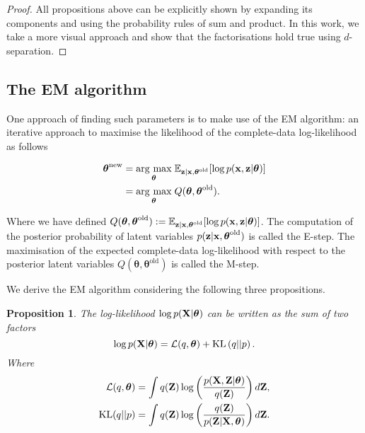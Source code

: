 \documentclass[11pt]{article}
\numberwithin{equation}{section}
\newcommand{\argmax}[1]{\underset{#1}{\operatorname{arg}\,\operatorname{max}}\;}
\newcommand{\KL}[2]{\text{KL}\left(#1 \vert\vert #2\right)}
\newcommand{\x}{{\bf x}}
\newcommand{\z}{{\bf z}}
\newtheorem{proposition}{Proposition}[section]
\begin{document}
\begin{proof}
	All propositions above can be explicitly shown by expanding its components and using the probability rules of sum and product. In this work, we take a more visual approach and show that the factorisations hold true using $d$-separation.
\end{proof}


\subsection{The EM algorithm}

One approach of finding such parameters is to make use of the EM algorithm: an iterative approach to maximise the likelihood of the complete-data log-likelihood as follows

\begin{align}
	\boldsymbol{\theta}^\text{new} &= \argmax{\boldsymbol{\theta}} \mathbb{E}_{\z\vert \x, \boldsymbol{\theta}^\text{old}}[\log p(\x, \z\vert \boldsymbol\theta)]\\
	&= \argmax{\boldsymbol{\theta}} Q(\boldsymbol\theta, \boldsymbol\theta^\text{old}).
\end{align}

Where we have defined $Q(\boldsymbol\theta, \boldsymbol\theta^\text{old}) := \mathbb{E}_{\z\vert \x, \boldsymbol{\theta}^\text{old}}[\log p(\x, \z\vert \boldsymbol\theta)]$. The computation of the posterior probability of latent variables $p(\z\vert \x, \boldsymbol\theta^\text{old})$ is called the E-step. The maximisation of the expected complete-data log-likelihood with respect to the posterior latent variables $Q(\boldsymbol\theta, \boldsymbol\theta^\text{old})$ is called the M-step.

We derive the EM algorithm considering the following three propositions.

\begin{proposition} \label{prop:log-likelihood-partition}
	The log-likelihood $\log p({\bf X} \vert \boldsymbol{\theta})$ can be written as the sum of two factors
	\begin{equation}
		\log p({\bf X} \vert \boldsymbol{\theta}) = \mathcal{L}(q, \boldsymbol{\theta}) +\KL{q}{p}.
	\end{equation}
	Where
	\begin{align}
		\mathcal{L}(q, \boldsymbol{\theta}) &= \int q({\bf Z})\log\left(\frac{p({\bf X}, {\bf Z} \vert \boldsymbol\theta)}{q({\bf Z})}\right) d{\bf Z},\\
		\text{KL}(q \vert\vert p) &= \int q({\bf Z}) \log\left(\frac{q({\bf Z})}{p({\bf Z}\vert {\bf X}, \boldsymbol\theta)}\right) d{\bf Z}.
	\end{align}
\end{proposition}
\end{document}
